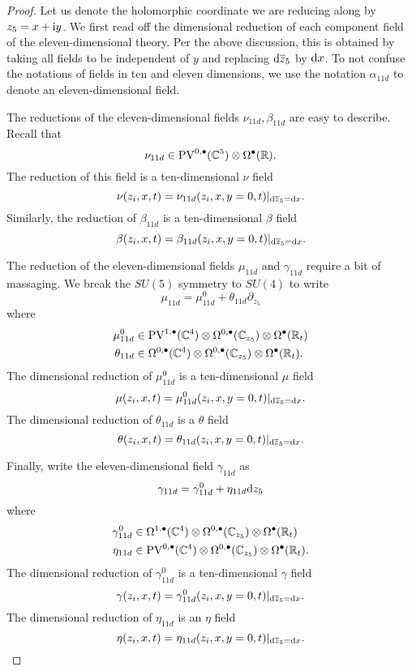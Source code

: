 \begin{proof}
Let us denote the holomorphic coordinate we are reducing along by $z_5 = x + {\rm i} y$. 
We first read off the dimensional reduction of each component field of the eleven-dimensional theory. 
Per the above discussion, this is obtained by taking all fields to be independent of $y$ and replacing ${\rm d} \overline{z}_5$ by ${\rm d} x$. 
To not confuse the notations of fields in ten and eleven dimensions, we use the notation $\alpha_{11d}$ to denote an eleven-dimensional field.

The reductions of the eleven-dimensional fields $\nu_{11d}, \beta_{11d}$ are easy to describe. 
Recall that 
\[
\nu_{11d} \in {\rm PV}^{0,\bullet}(\mathbb C^5) \otimes \Omega^\bullet(\mathbb R) .
\]
The reduction of this field is a ten-dimensional $\nu$ field
\[
\nu (z_i,x,t) = \nu_{11d} (z_i, x, y=0, t) |_{{\rm d} \overline{z}_5 = {\rm d} x}  .
\]
Similarly, the reduction of $\beta_{11d}$ is a ten-dimensional $\beta$ field
\[
\beta (z_i,x,t) = \beta_{11d} (z_i, x, y=0, t) |_{{\rm d} \overline{z}_5 = {\rm d} x}  .
\]

The reduction of the eleven-dimensional fields $\mu_{11d}$ and $\gamma_{11d}$ require a bit of massaging. 
We break the $SU(5)$ symmetry to $SU(4)$ to write
\[
\mu_{11d} = \mu^0_{11d} + \theta_{11d} \partial_{z_5} 
\]
where
\begin{align*}
\mu^0_{11d} & \in {\rm PV}^{1,\bullet}(\mathbb C^4) \otimes \Omega^{0,\bullet}(\mathbb C_{z_5}) \otimes \Omega^\bullet(\mathbb R_t) \\
\theta_{11d} & \in \Omega^{0,\bullet}(\mathbb C^4) \otimes \Omega^{0,\bullet}(\mathbb C_{z_5}) \otimes \Omega^\bullet(\mathbb R_t) .
\end{align*}
The dimensional reduction of $\mu^0_{11d}$ is a ten-dimensional $\mu$ field
\[
\mu(z_i,x,t) = \mu_{11d}^0 (z_i, x,y=0,t)|_{{\rm d} \overline{z}_5 = {\rm d} x} .
\]
The dimensional reduction of $\theta_{11d}$ is a $\theta$ field
\[
\theta(z_i,x,t) = \theta_{11d} (z_i, x,y=0,t)|_{{\rm d} \overline{z}_5 = {\rm d} x} .
\]

Finally, write the eleven-dimensional field $\gamma_{11d}$ as
\[
\gamma_{11d} = \gamma_{11d}^0 + \eta_{11d} {\rm d} z_5
\]
where
\begin{align*}
\gamma^0_{11d} & \in \Omega^{1,\bullet}(\mathbb C^4) \otimes \Omega^{0,\bullet}(\mathbb C_{z_5}) \otimes \Omega^\bullet(\mathbb R_t) \\
\eta_{11d} & \in {\rm PV}^{0,\bullet}(\mathbb C^4) \otimes \Omega^{0,\bullet}(\mathbb C_{z_5}) \otimes \Omega^\bullet(\mathbb R_t) .
\end{align*}
The dimensional reduction of $\gamma^0_{11d}$ is a ten-dimensional $\gamma$ field
\[
\gamma(z_i,x,t) = \gamma_{11d}^0 (z_i, x,y=0,t)|_{{\rm d} \overline{z}_5 = {\rm d} x} .
\]
The dimensional reduction of $\eta_{11d}$ is an $\eta$ field
\[
\eta(z_i,x,t) = \eta_{11d} (z_i, x,y=0,t)|_{{\rm d} \overline{z}_5 = {\rm d} x} .
\]


\end{proof}
